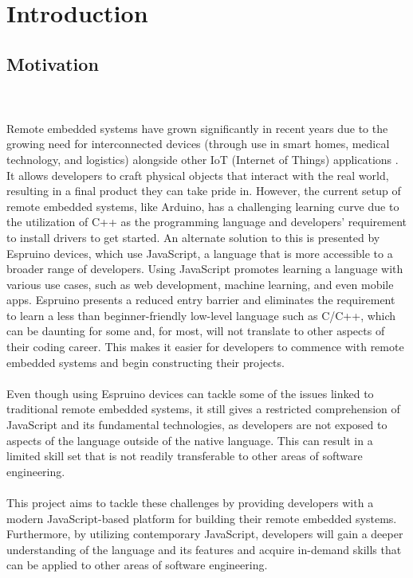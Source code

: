 \documentclass{l4proj}
\begin{document}
\educationalconsent

\tableofcontents
\listoffigures

\chapter{Introduction}



\section{Motivation}

\text 
\\ \\
Remote embedded systems have grown significantly in recent years due to the growing need for interconnected devices (through use in smart homes, medical technology, and logistics) alongside other IoT (Internet of Things) applications \cite{embedded-boom}. It allows developers to craft physical objects that interact with the real world, resulting in a final product they can take pride in. However, the current setup of remote embedded systems, like Arduino, has a challenging learning curve due to the utilization of C++ as the programming language and developers' requirement to install drivers to get started.
An alternate solution to this is presented by Espruino devices, which use JavaScript, a language that is more accessible to a broader range of developers. Using JavaScript promotes learning a language with various use cases, such as web development, machine learning, and even mobile apps. Espruino presents a reduced entry barrier and eliminates the requirement to learn a less than beginner-friendly low-level language such as C/C++, which can be daunting for some and, for most, will not translate to other aspects of their coding career. This makes it easier for developers to commence with remote embedded systems and begin constructing their projects.
\\ \\
Even though using Espruino devices can tackle some of the issues linked to traditional remote embedded systems, it still gives a restricted comprehension of JavaScript and its fundamental technologies, as developers are not exposed to aspects of the language outside of the native language. This can result in a limited skill set that is not readily transferable to other areas of software engineering.
\\ \\
This project aims to tackle these challenges by providing developers with a modern JavaScript-based platform for building their remote embedded systems. Furthermore, by utilizing contemporary JavaScript, developers will gain a deeper understanding of the language and its features and acquire in-demand skills that can be applied to other areas of software engineering.
\end{document}
